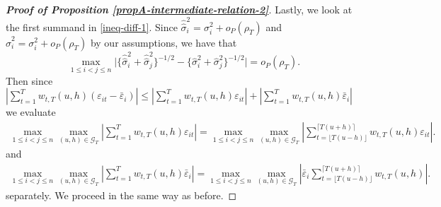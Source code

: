 \documentclass[a4paper,12pt]{article}
\newcommand{\doublehattwo}[1]{\widehat{\widehat{#1}}}
\begin{document}
\begin{proof}[\textnormal{\textbf{Proof of Proposition \ref{propA-intermediate-relation-2}}}]
Lastly, we look at the first summand in \eqref{ineq-diff-1}. Since $\doublehattwo{\sigma}_i^2 = \sigma_i^2 + o_P(\rho_T)$ and $\widehat{\sigma}_i^2 = \sigma_i^2 + o_P(\rho_T)$ by our assumptions, we have that \[\max_{1 \le i < j \le n} \big|\{\doublehattwo{\sigma}_i^2 + \doublehattwo{\sigma}_j^2 \}^{-1/2} - \{\widehat{\sigma}_i^2 + \widehat{\sigma}_j^2 \}^{-1/2}\big| = o_P(\rho_T).\]
Then since $\left| \sum_{t=1}^T w_{t,T}(u,h) (\varepsilon_{it} - \bar{\varepsilon}_i) \right| \leq \left| \sum_{t=1}^T w_{t,T}(u,h) \varepsilon_{it} \right| + \left| \sum_{t=1}^T w_{t,T}(u,h)\bar{\varepsilon}_i \right|$ we evaluate 
\begin{align*}
\max_{1 \le i < j \le n} \max_{(u,h) \in \mathcal{G}_T}\left| \sum_{t=1}^T w_{t,T}(u,h) \varepsilon_{it} \right|   = \max_{1 \le i < j \le n} \max_{(u,h) \in \mathcal{G}_T} \left| \sum_{t=\lfloor T(u-h) \rfloor}^{\lceil T(u+h) \rceil} w_{t,T}(u,h)\varepsilon_{it} \right|.
\end{align*}
and 
\begin{align*}
\max_{1 \le i < j \le n} \max_{(u,h) \in \mathcal{G}_T}\left| \sum_{t=1}^T w_{t,T}(u,h) \bar{\varepsilon}_i \right|   = \max_{1 \le i < j \le n} \max_{(u,h) \in \mathcal{G}_T} \left|\bar{\varepsilon}_i \sum_{t=\lfloor T(u-h) \rfloor}^{\lceil T(u+h) \rceil} w_{t,T}(u,h) \right|.
\end{align*}
separately. We proceed in the same way as before.


\end{proof}
\end{document}
